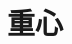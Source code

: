 \documentclass[../../all/physics-standard_questions_all.tex]{subfiles}
\begin{document}
\section{重心}
\end{document}
